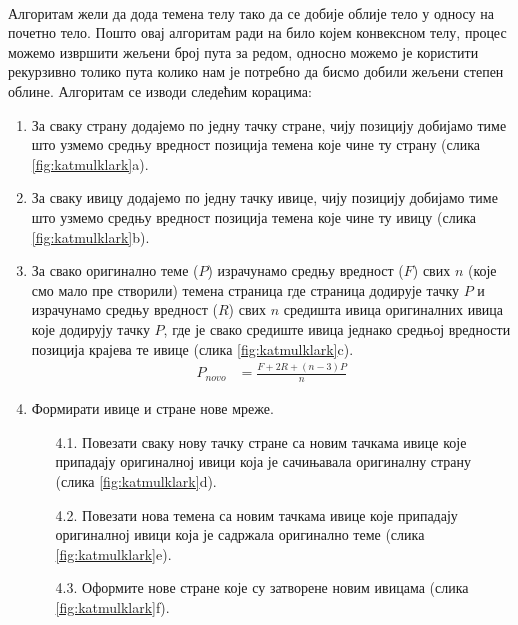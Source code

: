 \documentclass[12pt]{article}
\begin{document}
	\paragraph{}
	Алгоритам жели да дода темена телу тако да се добије облије тело у односу на почетно тело. Пошто овај алгоритам ради на било којем конвексном телу, процес можемо извршити жељени број пута за редом, односно можемо је користити рекурзивно толико пута колико нам је потребно да бисмо добили жељени степен облине.  Алгоритам се изводи следећим корацима:
	\begin{enumerate}
		\item За сваку страну додајемо по једну тачку стране, чију позицију добијамо тиме што узмемо средњу вредност позиција темена које чине ту страну (слика \ref{fig:katmulklark}a).
		\item За сваку ивицу додајемо по једну тачку ивице, чију позицију добијамо тиме што узмемо средњу вредност позиција темена које чине ту ивицу (слика \ref{fig:katmulklark}b).
		\item За свако оригинално теме ($P$) израчунамо средњу вредност ($F$) свих $n$ (које смо мало пре створили) темена страница где страница додирује тачку $P$ и израчунамо средњу вредност ($R$) свих $n$ средишта ивица оригиналних ивица које додирују тачку $P$, где је свако средиште ивица једнако средњој вредности позиција крајева те ивице (слика \ref{fig:katmulklark}c).
		\begin{align}
			P_{novo}&=\frac{F+2R+(n-3)P}{n}
		\end{align}
		
		\item Формирати ивице и стране нове мреже.
		\begin{enumerate}
			\item[4.1.] Повезати сваку нову тачку стране са новим тачкама ивице које припадају оригиналној ивици која је сачињавала оригиналну страну (слика \ref{fig:katmulklark}d).
			\item[4.2.] Повезати нова темена са новим тачкама ивице које припадају оригиналној ивици која је садржала оригинално теме (слика \ref{fig:katmulklark}e).
			\item[4.3.] Оформите нове стране које су затворене новим ивицама (слика \ref{fig:katmulklark}f).
		\end{enumerate}
	\end{enumerate}
\end{document}
